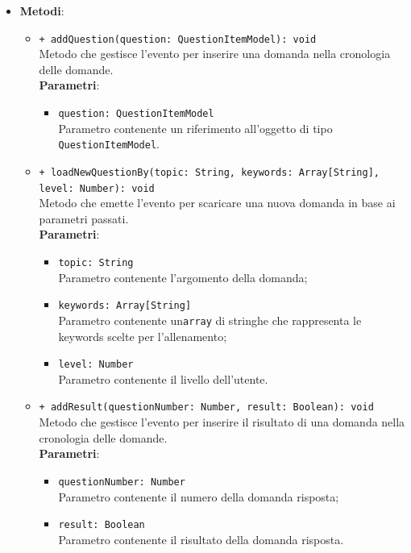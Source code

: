 \begin{itemize}
\begin{itemize}
		\end{itemize}
		\item \textbf{Metodi}: 
		\begin{itemize}
			\item \texttt{+ addQuestion(question: QuestionItemModel): void} \\
			Metodo che gestisce l'evento per inserire una domanda nella cronologia delle domande. \\
			\textbf{Parametri}:
			\begin{itemize}
				\item \texttt{question: QuestionItemModel} \\
				Parametro contenente un riferimento all'oggetto di tipo \texttt{QuestionItemModel}.
			\end{itemize}
			\item \texttt{+ loadNewQuestionBy(topic: String, keywords: Array[String], \\level: Number): void} \\
			Metodo che emette l'evento per scaricare una nuova domanda in base ai parametri passati. \\
			\textbf{Parametri}:
			\begin{itemize}
				\item \texttt{topic: String} \\
				Parametro contenente l'argomento della domanda;
				\item \texttt{keywords: Array[String]} \\
				Parametro contenente un\texttt{array} di stringhe che rappresenta le keywords scelte per l'allenamento;
				\item \texttt{level: Number} \\
				Parametro contenente il livello dell'utente.
			\end{itemize}
			\item \texttt{+ addResult(questionNumber: Number, result: Boolean): void} \\
			Metodo che gestisce l'evento per inserire il risultato di una domanda nella cronologia delle domande. \\
			\textbf{Parametri}:
			\begin{itemize}
				\item \texttt{questionNumber: Number} \\
				Parametro contenente il numero della domanda risposta;
				\item \texttt{result: Boolean} \\
				Parametro contenente il risultato della domanda risposta.

\end{itemize}
\end{itemize}
\end{itemize}
